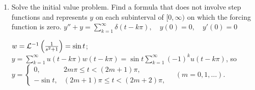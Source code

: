 \documentclass{ximera}
\begin{document}
\begin{problem}
\begin{enumerate}
\item Solve the initial value problem. Find a formula that
does not involve step functions and represents $y$  on each subinterval of $[0,\infty)$ on which the forcing function is zero.
$y''+y=\sum_{k=1}^\infty\delta(t-k\pi), \quad  y(0)=0,\quad y'(0)=0$

\begin{solution}
$w={\cal L}^{-1}\left(\frac{1}{ s^2+1}\right)=\sin t$;
$y=\sum_{k=1}^\infty u(t-k\pi)w(t-k\pi)=
\sin t\sum_{k=1}^\infty(-1)^k u(t-k\pi)$, so
  $y={\left\{\begin{array}{cl}0,&2m\pi\le t<(2m+1)\pi,\\
-\sin t,&(2m+1)\pi\le t<(2m+2)\pi,\end{array}\right.\quad
(m=0,1,\dots)}$.
\end{solution}
\end{enumerate}
\end{problem}
\end{document}
